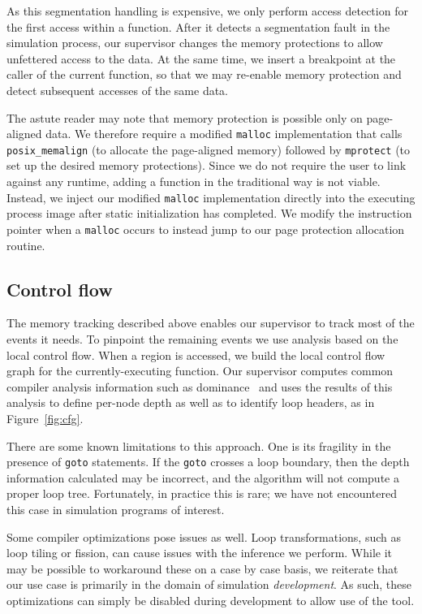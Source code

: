 As this segmentation handling is expensive, we only perform access
detection for the first access within a function.  After it detects a
segmentation fault in the simulation process, our supervisor changes
the memory protections to allow unfettered access to the data.  At
the same time, we insert a breakpoint at the caller of the current
function, so that we may re-enable memory protection and detect
subsequent accesses of the same data.

The astute reader may note that memory protection is possible only on
page-aligned data.  We therefore require a modified \texttt{malloc}
implementation that calls \texttt{posix\_memalign} (to allocate the
page-aligned memory) followed by \texttt{mprotect} (to set up the
desired memory protections).  Since we do not require the user to link
against any runtime, adding a function in the traditional way is not
viable.  Instead, we inject our modified \texttt{malloc} implementation
directly into the executing process image after static initialization
has completed.  We modify the instruction pointer when a
\texttt{malloc} occurs to instead jump to our page protection
allocation routine.

\subsection{Control flow}

The memory tracking described above enables our supervisor to track
most of the events it needs.  To pinpoint the remaining events we use
analysis based on the local control flow.  When a region is accessed,
we build the local control flow graph for the currently-executing
function.  Our supervisor computes common compiler analysis
information such as dominance~\cite{Torczon:2007:Compiler} and uses
the results of this analysis to define per-node depth as well as to
identify
loop headers, as in Figure~\ref{fig:cfg}.

There are some known limitations to this approach.  One is its
fragility in the presence of
\texttt{goto} statements.  If the \texttt{goto} crosses a loop
boundary, then the depth information calculated may be incorrect, and
the algorithm will not compute a proper loop tree.  Fortunately, in
practice this is rare; we have not encountered this case in simulation
programs of interest.

Some compiler optimizations pose issues as well.  Loop transformations,
such as loop tiling or fission, can cause issues with the inference we
perform.  While it may be possible to workaround these on a case by
case basis, we reiterate that our use case is primarily in the domain
of simulation \emph{development}.  As such, these optimizations can
simply be disabled during development to allow use of the tool.

